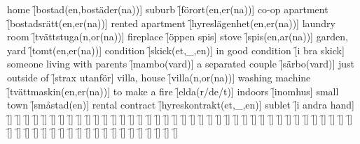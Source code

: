 \begin{questions}
    \begin{multicols}{2}
        \raggedcolumns
        \question home \f[bostad(en,bostäder(na))]
        \question suburb \f[förort(en,er(na))]
        \question co-op apartment \f[bostadsrätt(en,er(na))]
        \question rented apartment \f[hyreslägenhet(en,er(na))]
        \question laundry room \f[tvättstuga(n,or(na))]
        \question fireplace \f[öppen spis]
        \question stove \f[spis(en,ar(na))]
        \question garden, yard \f[tomt(en,er(na))]
        \question condition \f[skick(et,\_,en)]
        \question in good condition \f[i bra skick]
        \question someone living with parents \f[mambo(vard)]
        \question a separated couple \f[särbo(vard)]
        \question just outside of \f[strax utanför]
        \question villa, house \f[villa(n,or(na))]
        \question washing machine \f[tvättmaskin(en,er(na))]
        \question to make a fire \f[elda(r/de/t)]
        \question indoors \f[inomhus]
        \question small town \f[småstad(en)]
        \question rental contract \f[hyreskontrakt(et,\_,en)]
        \question sublet \f[i andra hand]
        \question  \f[]
        \question  \f[]
        \question  \f[]
        \question  \f[]
        \question  \f[]
        \question  \f[]
        \question  \f[]
        \question  \f[]
        \question  \f[]
        \question  \f[]
        \question  \f[]
        \question  \f[]
        \question  \f[]
        \question  \f[]
        \question  \f[]
        \question  \f[]
        \question  \f[]
        \question  \f[]
        \question  \f[]
        \question  \f[]
        \question  \f[]
        \question  \f[]
        \question  \f[]
        \question  \f[]
        \question  \f[]
        \question  \f[]
        \question  \f[]
        \question  \f[]
        \question  \f[]
        \question  \f[]
        \question  \f[]
        \question  \f[]
        \question  \f[]
        \question  \f[]
        \question  \f[]
        \question  \f[]
        \question  \f[]
        \question  \f[]
        \question  \f[]
        \question  \f[]
        \question  \f[]
        \question  \f[]
        \question  \f[]
        \question  \f[]
        \question  \f[]
        \question  \f[]
        \question  \f[]
        \question  \f[]
        \question  \f[]
        \question  \f[]
        \question  \f[]
        \question  \f[]
        \question  \f[]
        \question  \f[]
        \question  \f[]
        \question  \f[]
        \question  \f[]
        \question  \f[]
        \question  \f[]
        \question  \f[]

\end{multicols}
\end{questions}
